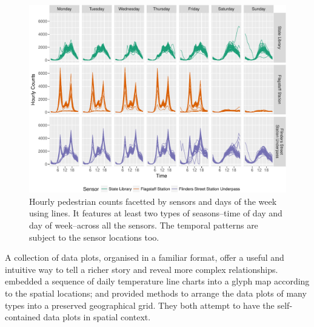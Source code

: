 \documentclass[article]{jss}
\begin{document}
\begin{CodeChunk}
\begin{figure}

{\centering \includegraphics[width=\textwidth]{figure/facet-time-1} 

}

\caption[Hourly pedestrian counts facetted by sensors and days of the week using lines]{Hourly pedestrian counts facetted by sensors and days of the week using lines. It features at least two types of seasons--time of day and day of week--across all the sensors. The temporal patterns are subject to the sensor locations too.}\label{fig:facet-time}
\end{figure}
\end{CodeChunk}

A collection of data plots, organised in a familiar format, offer a
useful and intuitive way to tell a richer story and reveal more complex
relationships. \citet{Wickham2012glyph} embedded a sequence of daily
temperature line charts into a glyph map according to the spatial
locations; and \citet{R-geofacet} provided methods to arrange the data
plots of many types into a preserved geographical grid. They both
attempt to have the self-contained data plots in spatial context.
\end{document}
